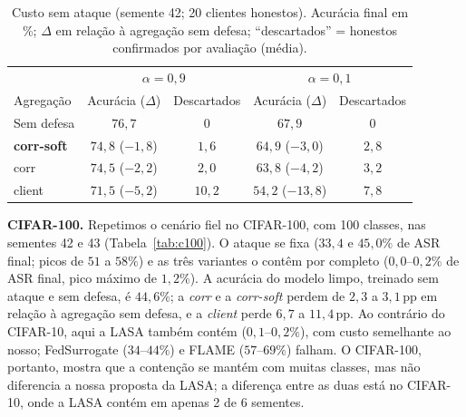 \begin{table}[t]\centering\small
\caption{Custo sem ataque (semente 42; 20 clientes honestos). Acurácia final em \%; $\Delta$ em
relação à agregação sem defesa; ``descartados'' = honestos confirmados por avaliação (média).}
\label{tab:fp}
\begin{tabular}{lcccc}
\toprule
& \multicolumn{2}{c}{$\alpha{=}0{,}9$} & \multicolumn{2}{c}{$\alpha{=}0{,}1$} \\
Agregação & Acurácia ($\Delta$) & Descartados & Acurácia ($\Delta$) & Descartados \\
\midrule
Sem defesa & $76{,}7$ & 0 & $67{,}9$ & 0 \\
\textbf{corr-soft} & $74{,}8$ ($-1{,}8$) & $1{,}6$ & $64{,}9$ ($-3{,}0$) & $2{,}8$ \\
corr & $74{,}5$ ($-2{,}2$) & $2{,}0$ & $63{,}8$ ($-4{,}2$) & $3{,}2$ \\
client & $71{,}5$ ($-5{,}2$) & $10{,}2$ & $54{,}2$ ($-13{,}8$) & $7{,}8$ \\
\bottomrule
\end{tabular}
\end{table}

\textbf{CIFAR-100.} Repetimos o cenário fiel no CIFAR-100, com 100 classes, nas sementes 42 e 43
(Tabela~\ref{tab:c100}). O ataque se fixa ($33{,}4$ e $45{,}0\%$ de ASR final; picos de $51$ a $58\%$)
e as três variantes o contêm por completo ($0{,}0$--$0{,}2\%$ de ASR final, pico máximo de $1{,}2\%$).
A acurácia do modelo limpo, treinado sem ataque e sem defesa, é $44{,}6\%$; a \emph{corr} e a
\emph{corr-soft} perdem de $2{,}3$ a $3{,}1$\,pp em relação à agregação sem defesa, e a \emph{client}
perde $6{,}7$ a $11{,}4$\,pp. Ao contrário do CIFAR-10, aqui a LASA também contém ($0{,}1$--$0{,}2\%$),
com custo semelhante ao nosso; FedSurrogate ($34$--$44\%$) e FLAME ($57$--$69\%$) falham. O CIFAR-100,
portanto, mostra que a contenção se mantém com muitas classes, mas não diferencia a nossa proposta
da LASA; a diferença entre as duas está no CIFAR-10, onde a LASA contém em apenas 2 de 6 sementes.

